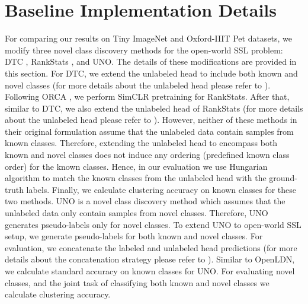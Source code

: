 \documentclass[runningheads]{eccv2022submission}
\begin{document}
\section{Baseline Implementation Details}
\label{sec:baseline}
For comparing our results on Tiny ImageNet and Oxford-IIIT Pet datasets, we modify three novel class discovery methods for the open-world SSL problem: DTC \cite{han2019learning}, RankStats \cite{Han2020Automatically}, and UNO\cite{fini2021unified}. The details of these modifications are provided in this section. For DTC\cite{han2019learning}, we extend the unlabeled head to include both known and novel classes (for more details about the unlabeled head please refer to \cite{han2019learning}). Following ORCA \cite{cao2022openworld}, we perform SimCLR pretraining for RankStats\cite{Han2020Automatically}. After that, similar to DTC, we also extend the unlabeled head of RankStats (for more details about the unlabeled head please refer to \cite{Han2020Automatically}). However, neither of these methods in their original formulation assume that the unlabeled data contain samples from known classes. Therefore, extending the unlabeled head to encompass both known and novel classes does not induce any ordering (predefined known class order) for the known classes. Hence, in our evaluation we use Hungarian algorithm \cite{kuhn1955hungarian} to match the known classes from the unlabeled head with the ground-truth labels. Finally, we calculate clustering accuracy on known classes for these two methods. UNO \cite{fini2021unified} is a novel class discovery method which assumes that the unlabeled data only contain samples from novel classes. Therefore, UNO generates pseudo-labels only for novel classes. To extend UNO to open-world SSL setup, we generate pseudo-labels for both known and novel classes. For evaluation, we concatenate the labeled and unlabeled head predictions (for more details about the concatenation strategy please refer to \cite{fini2021unified}). Similar to OpenLDN, we calculate standard accuracy on known classes for UNO. For evaluating novel classes, and the joint task of classifying both known and novel classes we calculate clustering accuracy.  
\end{document}
